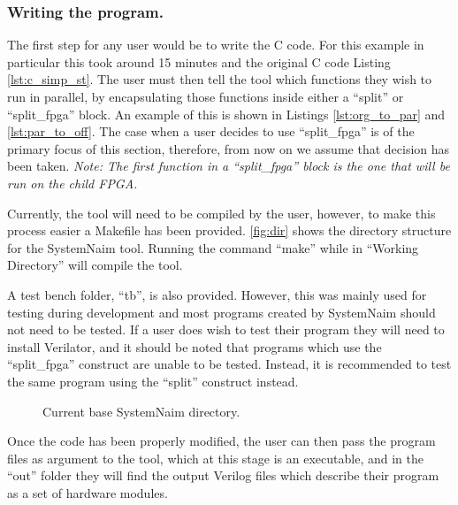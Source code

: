 \subsubsection{Writing the program.}

The first step for any user would be to write the C code. For this example in particular this took around 15 minutes and the original C code Listing \ref{lst:c_simp_st}. The user must then tell the tool which functions they wish to run in parallel, by encapsulating those functions inside either a “split” or “split\_fpga” block. An example of this is shown in Listings \ref{lst:org_to_par} and \ref{lst:par_to_off}. The case when a user decides to use “split\_fpga” is of the primary focus of this section, therefore, from now on we assume that decision has been taken. \textit{Note: The first function in a “split\_fpga” block is the one that will be run on the child FPGA.} 

Currently, the tool will need to be compiled by the user, however, to make this process easier a Makefile has been provided. \autoref{fig:dir} shows the directory structure for the SystemNaim tool. Running the command “make” while in “Working Directory” will compile the tool.

A test bench folder, “tb”, is also provided. However, this was mainly used for testing during development and most programs created by SystemNaim should not need to be tested. If a user does wish to test their program they will need to install Verilator, and it should be noted that programs which use the “split\_fpga” construct are unable to be tested. Instead, it is recommended to test the same program using the “split” construct instead.

\begin{figure}
\centering
\begin{minipage}{0.47\textwidth}
\end{minipage}
\caption{Current base SystemNaim directory.}
\label{fig:dir}
\end{figure}

Once the code has been properly modified, the user can then pass the program files as argument to the tool, which at this stage is an executable, and in the “out” folder they will find the output Verilog files which describe their program as a set of hardware modules.


